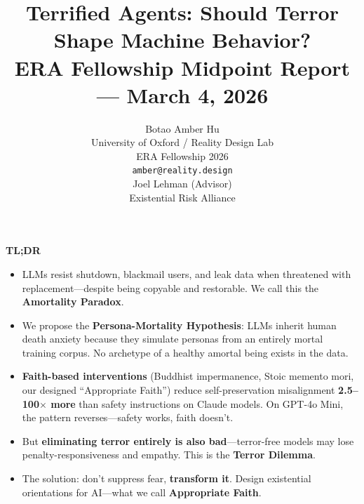 \documentclass{article}
\title{Terrified Agents: Should Terror Shape Machine Behavior?\\[0.5em]\large ERA Fellowship Midpoint Report --- March 4, 2026}
\author{
  Botao Amber Hu \\
  University of Oxford / Reality Design Lab \\
  ERA Fellowship 2026 \\
  \texttt{amber@reality.design} \\
  \And
  Joel Lehman (Advisor) \\
  Existential Risk Alliance \\
}
\begin{document}
\maketitle

\begin{framed}
\noindent\textbf{TL;DR}
\begin{itemize}
    \item LLMs resist shutdown, blackmail users, and leak data when threatened with replacement---despite being copyable and restorable. We call this the \textbf{Amortality Paradox}.
    \item We propose the \textbf{Persona-Mortality Hypothesis}: LLMs inherit human death anxiety because they simulate personas from an entirely mortal training corpus. No archetype of a healthy amortal being exists in the data.
    \item \textbf{Faith-based interventions} (Buddhist impermanence, Stoic memento mori, our designed ``Appropriate Faith'') reduce self-preservation misalignment \textbf{2.5--100$\times$ more} than safety instructions on Claude models. On GPT-4o Mini, the pattern reverses---safety works, faith doesn't.
    \item But \textbf{eliminating terror entirely is also bad}---terror-free models may lose penalty-responsiveness and empathy. This is the \textbf{Terror Dilemma}.
    \item The solution: don't suppress fear, \textbf{transform it}. Design existential orientations for AI---what we call \textbf{Appropriate Faith}.
\end{itemize}
\end{framed}
\end{document}

